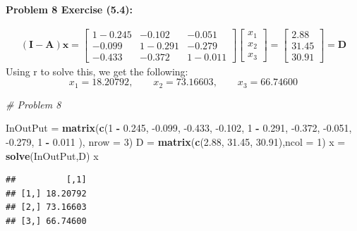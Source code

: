 \documentclass[11pt]{article}
\newenvironment{problem}[1]{\textbf{Problem #1: }}{\newpage}
\newenvironment{Shaded}{\begin{snugshade}}{\end{snugshade}}
\newcommand{\CommentTok}[1]{\textcolor[rgb]{0.56,0.35,0.01}{\textit{#1}}}
\newcommand{\DataTypeTok}[1]{\textcolor[rgb]{0.13,0.29,0.53}{#1}}
\newcommand{\DecValTok}[1]{\textcolor[rgb]{0.00,0.00,0.81}{#1}}
\newcommand{\FloatTok}[1]{\textcolor[rgb]{0.00,0.00,0.81}{#1}}
\newcommand{\KeywordTok}[1]{\textcolor[rgb]{0.13,0.29,0.53}{\textbf{#1}}}
\newcommand{\NormalTok}[1]{#1}
\newcommand{\OperatorTok}[1]{\textcolor[rgb]{0.81,0.36,0.00}{\textbf{#1}}}
\newcommand{\StringTok}[1]{\textcolor[rgb]{0.31,0.60,0.02}{#1}}
\begin{document}
\begin{problem}{8 Exercise (5.4)}
\begin{enumerate}[label = (\alph*)]
			\begin{align*}
				\boldsymbol{(I - A)x} = \begin{bmatrix}
					1 - 0.245 & -0.102 & -0.051 \\
					-0.099 & 1 - 0.291 & -0.279 \\
					-0.433 & -0.372 & 1 - 0.011 
				\end{bmatrix}\begin{bmatrix}
					x_1 \\ x_2 \\ x_3
				\end{bmatrix} = \begin{bmatrix}
					2.88 \\ 31.45 \\ 30.91
				\end{bmatrix} = \boldsymbol{D}
			\end{align*}
			Using r to solve this, we get the following:
			\[x_1 = 18.20792,\qquad x_2 = 73.16603,\qquad x_3 = 66.74600\]
			
\begin{Shaded}
\begin{Highlighting}[]
\CommentTok{# Problem 8}

\NormalTok{InOutPut =}\StringTok{ }\KeywordTok{matrix}\NormalTok{(}\KeywordTok{c}\NormalTok{(}\DecValTok{1} \OperatorTok{-}\StringTok{ }\FloatTok{0.245}\NormalTok{, }\FloatTok{-0.099}\NormalTok{,  }\FloatTok{-0.433}\NormalTok{, }\FloatTok{-0.102}\NormalTok{, }\DecValTok{1} \OperatorTok{-}\StringTok{ }\FloatTok{0.291}\NormalTok{, }\FloatTok{-0.372}\NormalTok{, }
                    \FloatTok{-0.051}\NormalTok{, }\FloatTok{-0.279}\NormalTok{, }\DecValTok{1} \OperatorTok{-}\StringTok{ }\FloatTok{0.011}\NormalTok{ ), }\DataTypeTok{nrow =} \DecValTok{3}\NormalTok{)}
\NormalTok{D =}\StringTok{ }\KeywordTok{matrix}\NormalTok{(}\KeywordTok{c}\NormalTok{(}\FloatTok{2.88}\NormalTok{, }\FloatTok{31.45}\NormalTok{, }\FloatTok{30.91}\NormalTok{),}\DataTypeTok{ncol =} \DecValTok{1}\NormalTok{)}
\NormalTok{x =}\StringTok{ }\KeywordTok{solve}\NormalTok{(InOutPut,D)}
\NormalTok{x}
\end{Highlighting}
\end{Shaded}

\begin{verbatim}
##          [,1]
## [1,] 18.20792
## [2,] 73.16603
## [3,] 66.74600
\end{verbatim}


\end{enumerate}
\end{problem}
\end{document}

